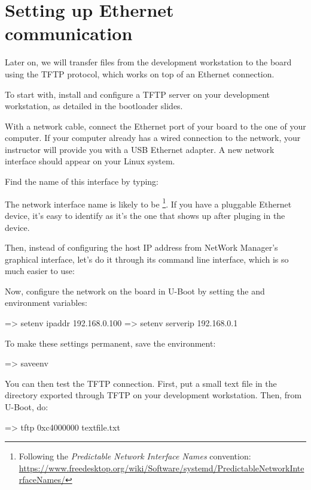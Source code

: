 \section{Setting up Ethernet communication}

Later on, we will transfer files from the development workstation to
the board using the TFTP protocol, which works on top of an Ethernet
connection.

To start with, install and configure a TFTP server on your development
workstation, as detailed in the bootloader slides.

With a network cable, connect the Ethernet port of
your board to the one of your computer. If your computer already has a
wired connection to the network, your instructor will provide you with
a USB Ethernet adapter. A new network interface should appear on your
Linux system.

Find the name of this interface by typing:

The network interface name is likely to be
\footnote{Following the {\em Predictable Network Interface
Names} convention:
\url{https://www.freedesktop.org/wiki/Software/systemd/PredictableNetworkInterfaceNames/}}.
If you have a pluggable Ethernet device, it's easy to identify as it's
the one that shows up after pluging in the device.

Then, instead of configuring the host IP address from NetWork Manager’s graphical interface,
let’s do it through its command line interface, which is so much easier to use:


Now, configure the network on the board in U-Boot by setting the 
and  environment variables:

\begin{ubootinput}
=> setenv ipaddr 192.168.0.100
=> setenv serverip 192.168.0.1
\end{ubootinput}

To make these settings permanent, save the environment:

\begin{ubootinput}
=> saveenv
\end{ubootinput}

You can then test the TFTP connection. First, put a small text file in
the directory exported through TFTP on your development
workstation. Then, from U-Boot, do:

\begin{ubootinput}
=> tftp 0xc4000000 textfile.txt
\end{ubootinput}

